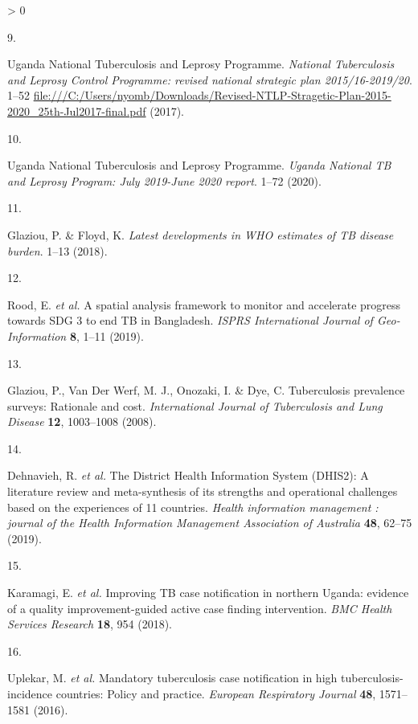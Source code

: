 \documentclass[
]{article}
\newlength{\cslhangindent}
\newlength{\csllabelwidth}
\newenvironment{CSLReferences}[2] %
 {%
  \setlength{\parindent}{0pt}
  \ifodd #1 \everypar{\setlength{\hangindent}{\cslhangindent}}\ignorespaces\fi
  \ifnum #2 > 0
  \setlength{\parskip}{#2\baselineskip}
  \fi
 }%
 {}
\newcommand{\CSLLeftMargin}[1]{\parbox[t]{\csllabelwidth}{#1}}
\newcommand{\CSLRightInline}[1]{\parbox[t]{\linewidth - \csllabelwidth}{#1}\break}
\begin{document}
\begin{CSLReferences}{0}{0}
\leavevmode\hypertarget{ref-UgandaNationalTuberculosisandLeprosyProgramme2017a}{}%
\CSLLeftMargin{9. }
\CSLRightInline{Uganda National Tuberculosis and Leprosy Programme. \emph{{National Tuberculosis and Leprosy Control Programme: revised national strategic plan 2015/16-2019/20}}. 1--52 \url{file:///C:/Users/nyomb/Downloads/Revised-NTLP-Stragetic-Plan-2015-2020_25th-Jul2017-final.pdf} (2017).}

\leavevmode\hypertarget{ref-UgandaNationalTuberculosisandLeprosyProgramme2020}{}%
\CSLLeftMargin{10. }
\CSLRightInline{Uganda National Tuberculosis and Leprosy Programme. \emph{{Uganda National TB and Leprosy Program: July 2019-June 2020 report}}. 1--72 (2020).}

\leavevmode\hypertarget{ref-Glaziou2018a}{}%
\CSLLeftMargin{11. }
\CSLRightInline{Glaziou, P. \& Floyd, K. \emph{{Latest developments in WHO estimates of TB disease burden}}. 1--13 (2018).}

\leavevmode\hypertarget{ref-Rood2019}{}%
\CSLLeftMargin{12. }
\CSLRightInline{Rood, E. \emph{et al.} {A spatial analysis framework to monitor and accelerate progress towards SDG 3 to end TB in Bangladesh}. \emph{ISPRS International Journal of Geo-Information} \textbf{8}, 1--11 (2019).}

\leavevmode\hypertarget{ref-Glaziou2008}{}%
\CSLLeftMargin{13. }
\CSLRightInline{Glaziou, P., Van Der Werf, M. J., Onozaki, I. \& Dye, C. {Tuberculosis prevalence surveys: Rationale and cost}. \emph{International Journal of Tuberculosis and Lung Disease} \textbf{12}, 1003--1008 (2008).}

\leavevmode\hypertarget{ref-Dehnavieh2019}{}%
\CSLLeftMargin{14. }
\CSLRightInline{Dehnavieh, R. \emph{et al.} {The District Health Information System (DHIS2): A literature review and meta-synthesis of its strengths and operational challenges based on the experiences of 11 countries}. \emph{Health information management : journal of the Health Information Management Association of Australia} \textbf{48}, 62--75 (2019).}

\leavevmode\hypertarget{ref-Karamagi2018}{}%
\CSLLeftMargin{15. }
\CSLRightInline{Karamagi, E. \emph{et al.} {Improving TB case notification in northern Uganda: evidence of a quality improvement-guided active case finding intervention}. \emph{BMC Health Services Research} \textbf{18}, 954 (2018).}

\leavevmode\hypertarget{ref-Uplekar2016}{}%
\CSLLeftMargin{16. }
\CSLRightInline{Uplekar, M. \emph{et al.} {Mandatory tuberculosis case notification in high tuberculosis-incidence countries: Policy and practice}. \emph{European Respiratory Journal} \textbf{48}, 1571--1581 (2016).}


\end{CSLReferences}
\end{document}
